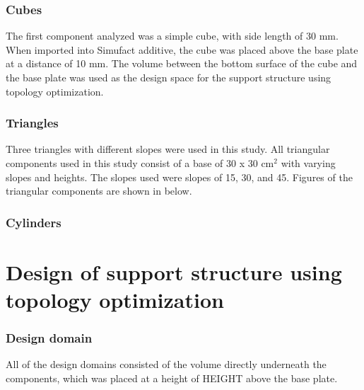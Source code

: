 \documentclass{article}
\begin{document}
\subsubsection{Cubes}

The first component analyzed was a simple cube, with side length of 30 mm. When imported into Simufact additive, the cube was placed above the base plate at a distance of 10 mm. The volume between the bottom surface of the cube and the base plate was used as the design space for the support structure using topology optimization.


\subsubsection{Triangles}

Three triangles with different slopes were used in this study. All triangular components used in this study consist of a base of 30 x 30 cm$^{2}$ with varying slopes and heights. The slopes used were slopes of 15\degree, 30\degree, and 45\degree. Figures of the triangular components are shown in  below.


\subsubsection{Cylinders}


\section{Design of support structure using topology optimization}



\subsubsection{Design domain}


All of the design domains consisted of the volume directly underneath the components, which was
placed at a height of HEIGHT above the base plate.
\end{document}
